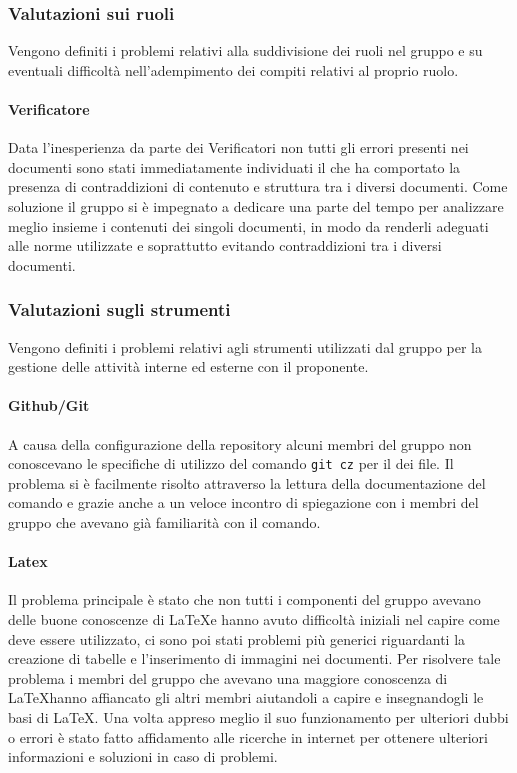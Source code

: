 \documentclass[../piano-di-qualifica.tex]{subfiles}
\begin{document}
\subsubsection{Valutazioni sui ruoli}
\label{sub:valutazioni_ruoli}
Vengono definiti i problemi relativi alla suddivisione dei ruoli nel gruppo e su eventuali difficoltà nell'adempimento dei compiti relativi al proprio ruolo.
\paragraph{Verificatore}
\label{sub:verificatore}
Data l'inesperienza da parte dei Verificatori non tutti gli errori presenti nei documenti sono stati immediatamente individuati il che ha comportato la presenza di contraddizioni di contenuto e struttura tra i diversi documenti.
Come soluzione il gruppo si è impegnato a dedicare una parte del tempo per analizzare meglio insieme i contenuti dei singoli documenti, in modo da renderli adeguati alle norme utilizzate e soprattutto evitando contraddizioni tra i diversi documenti.

\subsubsection{Valutazioni sugli strumenti}
\label{sub:valutazioni_strumenti}
Vengono definiti i problemi relativi agli strumenti utilizzati dal gruppo per la gestione delle attività interne ed esterne con il proponente.

\paragraph{Github/Git}
\label{sub:github}
A causa della configurazione della repository alcuni membri del gruppo non conoscevano le specifiche di utilizzo del comando \texttt{git cz} per il  dei file. Il problema si è facilmente risolto attraverso la lettura della documentazione del comando e grazie anche a un veloce incontro di spiegazione con i membri del gruppo che avevano già familiarità con il comando.

\paragraph{Latex}
\label{sub:latex}
Il problema principale è stato che non tutti i componenti del gruppo avevano delle buone conoscenze di \LaTeX e hanno avuto difficoltà iniziali nel capire come deve essere utilizzato, ci sono poi stati problemi più generici riguardanti la creazione di tabelle e l'inserimento di immagini nei documenti.
Per risolvere tale problema i membri del gruppo che avevano una maggiore conoscenza di \LaTeX hanno affiancato gli altri membri aiutandoli a capire e insegnandogli le basi di \LaTeX. Una volta appreso meglio il suo funzionamento per ulteriori dubbi o errori è stato fatto affidamento alle ricerche in internet per ottenere ulteriori informazioni e soluzioni in caso di problemi.
\end{document}
